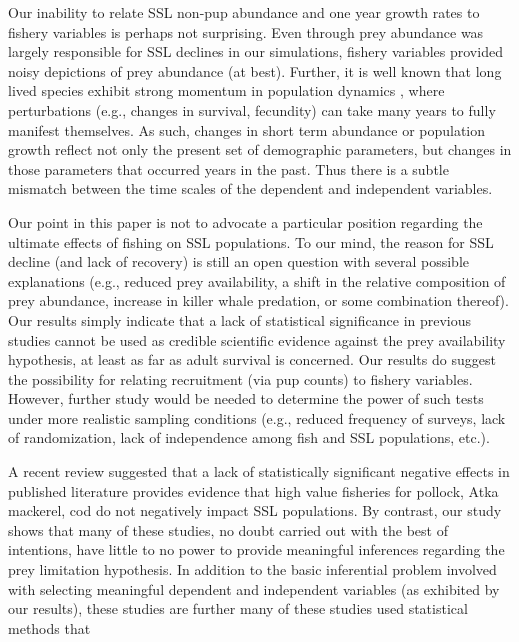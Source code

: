 \documentclass[nonumbib,leqno]{nrc1}
\begin{document}
Our inability to relate SSL non-pup abundance and one year growth rates to fishery variables is perhaps not surprising.  Even through prey abundance was largely responsible for SSL declines in our simulations, fishery variables provided noisy depictions of prey abundance (at best).  Further, it is well known that long lived species exhibit strong momentum in population dynamics \citep[see][for a review]{EzardEtAl2010}, where perturbations (e.g., changes in survival, fecundity) can take many years to fully manifest themselves.  As such, changes in short term abundance or population growth reflect not only the present set of demographic parameters, but changes in those parameters that occurred years in the past.  Thus there is a subtle mismatch between the time scales of the dependent and independent variables.

Our point in this paper is not to advocate a particular position regarding the ultimate effects of fishing on SSL populations.  To our mind, the reason for SSL decline (and lack of recovery) is still an open question with several possible explanations (e.g., reduced prey availability, a shift in the relative composition of prey abundance, increase in killer whale predation, or some combination thereof).  Our results simply indicate that a lack of statistical significance in previous studies cannot be used as credible scientific evidence against the prey availability hypothesis, at least as far as adult survival is concerned.  Our results do suggest the possibility for relating recruitment (via pup counts) to fishery variables.  However, further study would be needed to determine the power of such tests under more realistic sampling conditions (e.g., reduced frequency of surveys, lack of randomization, lack of independence among fish and SSL populations, etc.).

A recent review \citep{Bernard:2011dq} suggested that a lack of statistically significant negative effects in published literature provides evidence that high value fisheries for pollock, Atka mackerel, cod do not negatively impact SSL populations.  By contrast, our study shows that many of these studies, no doubt carried out with the best of intentions, have little to no power to provide meaningful inferences regarding the prey limitation hypothesis.  In addition to the basic inferential problem involved with selecting meaningful dependent and independent variables (as exhibited by our results), these studies are further many of these studies used statistical methods that
\end{document}
